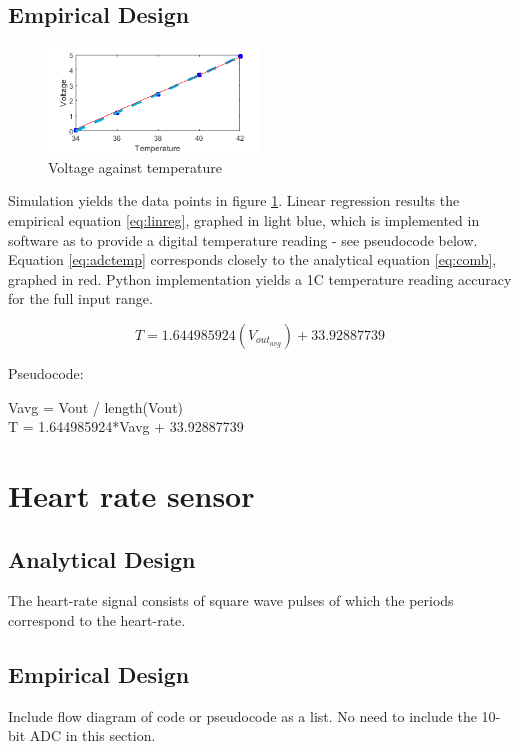 	\subsection{Empirical Design} \label{sec:ADCTempEmp}
\begin{figure}
\centering
\vspace{-0.6cm}
\includegraphics[width=0.5\textwidth]{./Figures/linreg}
\caption{Voltage against temperature}
\label{fig:linreg}
\end{figure}
Simulation yields the data points in figure \ref{fig:linreg}. Linear regression results the empirical equation \ref{eq:linreg}, graphed in light blue, which is implemented in software as to provide a digital temperature reading - see pseudocode below. Equation \ref{eq:adctemp} corresponds closely to the analytical equation \ref{eq:comb}, graphed in red. Python implementation yields a 1\degree C temperature reading accuracy for the full input range. 
 
\begin{equation}
\label{eq:linreg}
T = 1.644985924\left(V_{out_{avg}}\right) + 33.92887739
\end{equation}

Pseudocode:
\begin{algorithm}
V\textunderscore avg = V\textunderscore out / length(V\textunderscore out)\\
T = 1.644985924*V\textunderscore avg + 33.92887739
\end{algorithm}





\vspace{-0.7cm}
\section{Heart rate sensor}
\label{sec:ADCHeart}


	\subsection{Analytical Design} 					\label{sec:ADCTempAna}
The heart-rate signal consists of square wave pulses of which the periods correspond to the heart-rate. 



	\subsection{Empirical Design} 					\label{sec:ADCTempEmp}

Include flow diagram of code or pseudocode as a list.
No need to include the 10-bit ADC in this section. 
